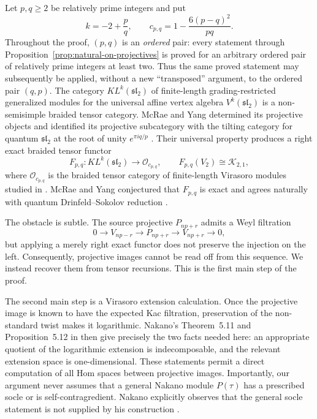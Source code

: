 \documentclass[12pt,leqno]{amsart}
\numberwithin{equation}{section}
\newcommand{\KL}{KL}
\newcommand{\Oc}{\mathcal O}
\newcommand{\Kac}{\mathcal K}
\begin{document}
Let $p,q\geq2$ be relatively prime integers and put
\begin{equation}\label{eq:parameters}
 k=-2+\frac pq,
 \qquad
 c_{p,q}=1-\frac{6(p-q)^2}{pq}.
\end{equation}
Throughout the proof, $(p,q)$ is an \emph{ordered} pair: every statement
through Proposition~\ref{prop:natural-on-projectives} is proved for an
arbitrary ordered pair of relatively prime integers at least two.  Thus the
same proved statement may subsequently be applied, without a new
``transposed'' argument, to the ordered pair $(q,p)$.
The category $\KL^k(\mathfrak{sl}_2)$ of finite-length grading-restricted
generalized modules for the universal affine vertex algebra
$V^k(\mathfrak{sl}_2)$ is a non-semisimple braided tensor category.  McRae
and Yang determined its projective objects and identified its projective
subcategory with the tilting category for quantum $\mathfrak{sl}_2$ at the
root of unity $e^{\pi iq/p}$ \cite{McRaeYang}.  Their universal property
produces a right exact braided tensor functor
\begin{equation}\label{eq:F-intro}
 F_{p,q}:\KL^k(\mathfrak{sl}_2)\longrightarrow\Oc_{c_{p,q}},
 \qquad F_{p,q}(V_2)\cong\Kac_{2,1},
\end{equation}
where $\Oc_{c_{p,q}}$ is the braided tensor category of finite-length
Virasoro modules studied in \cite{McRaeSopin}.  McRae and Yang conjectured
that $F_{p,q}$ is exact and agrees naturally with quantum
Drinfeld--Sokolov reduction \cite[Conjecture~7.16]{McRaeYang}.

The obstacle is subtle.  The source projective $P_{np+r}$ admits a Weyl
filtration
\[
 0\longrightarrow V_{np-r}\longrightarrow P_{np+r}
 \longrightarrow V_{np+r}\longrightarrow0,
\]
but applying a merely right exact functor does not preserve the injection on
the left.  Consequently, projective images cannot be read off from this
sequence.  We instead recover them from tensor recursions.  This is the first
main step of the proof.

The second main step is a Virasoro extension calculation.  Once the
projective image is known to have the expected Kac filtration, preservation
of the non-standard twist makes it logarithmic.  Nakano's Theorem~5.11 and
Proposition~5.12 in \cite{Nakano} then give precisely
the two facts needed here: an appropriate quotient of the logarithmic
extension is indecomposable, and the relevant extension space is
one-dimensional.  These statements permit a direct computation of all Hom
spaces between projective images.  Importantly, our argument never assumes
that a general Nakano module $P(\tau)$ has a prescribed socle or is
self-contragredient.  Nakano explicitly observes that the general socle
statement is not supplied by his construction
\cite[Figure~5.1 and the discussion following it]{Nakano}.
\end{document}
